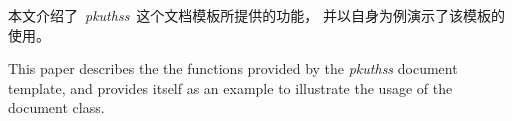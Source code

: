 
\cleardoublepage
\begin{cabstract}

	本文介绍了~\emph{pkuthss}~这个文档模板所提供的功能，
	并以自身为例演示了该模板的使用。

\end{cabstract}

\cleardoublepage
\begin{eabstract}

	This paper describes the the functions provided by
	the \emph{pkuthss} document template,
	and provides itself as an example to illustrate
	the usage of the document class.

\end{eabstract}

